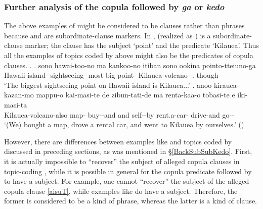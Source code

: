 
\subsubsection{Further analysis of the copula followed by \textit{ga} or \textit{kedo}}

The above examples of  might be considered to be clauses rather than phrases
because  and  are subordinate-clause markers.
In \Next,
 (realized as ) is a subordinate-clause marker;
the clause has the subject  `point' and the predicate  `Kilauea'.
Thus all the examples of topics coded by  above might also be the predicates of copula clauses.
%
\ex. \ag. sono hawai-too-no ma kankoo-no itiban sono ookina pointo-tteiuno-ga  \\
		 Hawaii-island-  sightseeing- most  big point- Kilauea-volcano--.-though \\
		`The biggest sightseeing point on Hawaii island is Kilauea...'
	\bg. anoo kirauea-kazan-mo mappu-o kai-masi-te de zibun-tati-de ma renta-kaa-o tobasi-te e iki-masi-ta \\
	 Kilauea-volcano-also map- buy--and and self--by  rent.a-car- drive-and  go-- \\
	`(We) bought a map, drove a rental car, and went to Kilauea by ourselves.'
		\hfill{()}

However, there are differences between examples like \Last[a]
and topics coded by  discussed in preceding sections,
as was mentioned in \S \ref{BackSubSubKedo}.
First,
it is actually impossible to ``recover'' the subject of alleged copula clauses in topic-coding ,
while it is possible in general for the copula predicate followed by  to have a subject.
For example,
one cannot ``recover'' the subject of the alleged copula clause \ref{aisuT},
while examples like \Last[a] do have a subject.
Therefore,
the former is considered to be a kind of phrase,
whereas the latter is a kind of clause.

